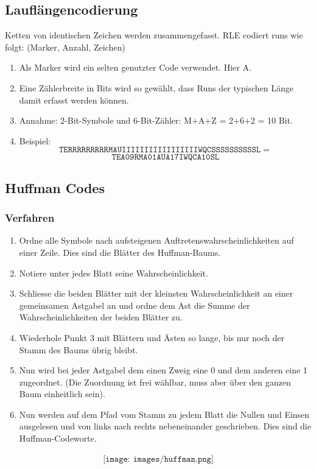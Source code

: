 \subsection{Lauflängencodierung}
Ketten von identischen Zeichen werden zusammengefasst. RLE codiert runs wie folgt: (Marker, Anzahl, Zeichen)
\begin{enumerate}
    \item Als Marker wird ein selten genutzter Code verwendet. Hier A.
    \item Eine Zählerbreite in Bits wird so gewählt, dass Runs der typischen Länge damit erfasst werden können.
    \item Annahme: 2-Bit-Symbole und 6-Bit-Zähler: M+A+Z = 2+6+2 = 10 Bit.
    \item Beispiel:
    \[\mathtt{TERRRRRRRRRMAUIIIIIIIIIIIIIIIIIWQCSSSSSSSSSSL}=\]
    \[\mathtt{TEA09RMA01AUA17IWQCA10SL}\]
\end{enumerate}

\subsection{Huffman Codes}
\subsubsection{Verfahren}
\begin{enumerate}
    \item Ordne alle Symbole nach aufsteigenen Auftretenswahrscheinlichkeiten auf einer Zeile. Dies sind die Blätter des Huffman-Baums.
    \item Notiere unter jedes Blatt seine Wahrscheinlichkeit.
    \item Schliesse die beiden Blätter mit der kleinsten Wahrscheinlichkeit an einer gemeinsamen Astgabel an und ordne dem Ast die Summe der Wahrscheinlichkeiten der beiden Blätter zu.
    \item Wiederhole Punkt 3 mit Blättern und Ästen so lange, bis nur noch der Stamm des Baums übrig bleibt.
    \item Nun wird bei jeder Astgabel dem einen Zweig eine 0 und dem anderen eine 1 zugeordnet. (Die Zuordnung ist frei wählbar, muss aber über den ganzen Baum einheitlich sein).
    \item Nun werden auf dem Pfad vom Stamm zu jedem Blatt die Nullen und Einsen ausgelesen und von links nach rechts nebeneinander geschrieben. Dies sind die Huffman-Codeworte.
\end{enumerate}
\begin{align*}
    \texttt{[image: images/huffman.png]}
\end{align*}

